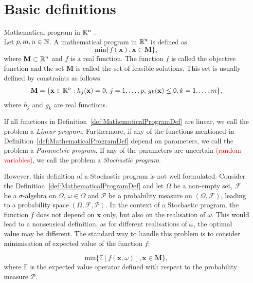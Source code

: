 \section{Basic definitions}
\begin{defn}{Mathematical program in $\mathbb{R}^n$ \cite[p. 107]{dupacovastochasticprogramming}}. \\
\label{def:MathematicalProgramDef}
Let $p,m,n \in \mathbb{N}$. A mathematical program in $\mathbb{R}^n$ is defined as
\begin{equation*}
\mathrm{min} \{f(\mathbf{x}), \mathbf{x} \in \mathbf{M}\},
\end{equation*}
where $\mathbf{M} \subset \mathbb{R}^n$ and $f$ is a real function. The function $f$ is called the objective function and the set $\mathbf{M}$ is called the set of feasible solutions.
This set is usually defined by constraints as follows:
\begin{equation*}
	\mathbf{M} = \{\mathbf{x} \in \mathbb{R}^n: h_j(\mathbf{x})=0, \, j=1,\dots,p, \, g_k(\mathbf{x}) \leq 0, k=1,\dots,m \},
\end{equation*}
where $h_j$ and $g_k$ are real functions.
\end{defn}
If all functions in Definition~\ref{def:MathematicalProgramDef} are linear, we call the problem a \textit{Linear program}.
Furthermore, if any of the functions mentioned in Definition~\ref{def:MathematicalProgramDef} depend on parameters, we call the problem a \textit{Parametric program}. If any of the parameters are uncertain \textcolor{red}{(random variables)}, we call the problem a \textit{Stochastic program}.


However, this definition of a Stochastic program is not well formulated. Consider the Definition~\ref{def:MathematicalProgramDef} and let $\Omega$ be a non-empty set, $\mathcal{F}$ be a  $\sigma$-algebra on $\Omega$, $\omega \in \Omega$ and $\mathcal{P}$ be a probability measure on $(\Omega, \mathcal{F})$, leading to a probability space $(\Omega, \mathcal{F}, \mathcal{P})$. In the context of a Stochastic program, the function $f$ does not depend on $\mathbf{x}$ only, but also on the realisation of $\omega$. This would lead to a nonsensical definition, as for different realisations of $\omega$, the optimal value may be different. The standard way to handle this problem is to consider minimisation of expected value of the function $f$:

\begin{equation*}
\mathrm{min} \{\mathbb{E}\left[f(\mathbf{x}, \omega)\right], \mathbf{x} \in \mathbf{M}\},
\end{equation*}
where $\mathbb{E}$ is the expected value operator defined with respect to the probability measure $\mathcal{P}$. 


